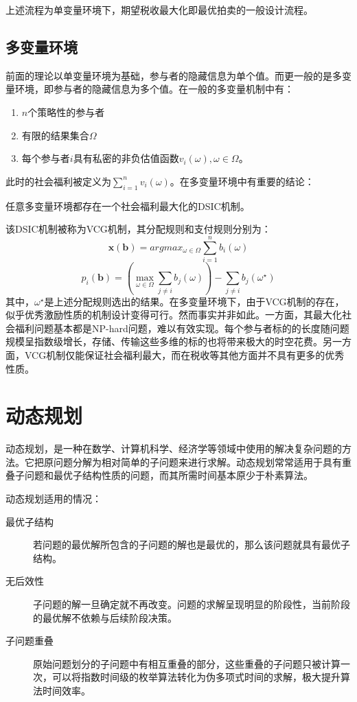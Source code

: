 \documentclass[promaster]{thesis-uestc}
\begin{document}
上述流程为单变量环境下，期望税收最大化即最优拍卖的一般设计流程。
\subsection{多变量环境}
前面的理论以单变量环境为基础，参与者的隐藏信息为单个值。而更一般的是多变量环境，即参与者的隐藏信息为多个值。在一般的多变量机制中有：

\begin{enumerate}
    \item $n$个策略性的参与者
    \item 有限的结果集合$\Omega$
    \item 每个参与者$i$具有私密的非负估值函数$v_i(\omega),\omega \in \Omega$。
\end{enumerate}

此时的社会福利被定义为$\sum_{i=1}^{n}{v_i(\omega)}$。在多变量环境中有重要的结论：
\begin{theorem}
    任意多变量环境都存在一个社会福利最大化的DSIC机制。
\end{theorem}
该DSIC机制被称为VCG机制，其分配规则和支付规则分别为：
\begin{equation}
 \mathbf{x}(\mathbf{b})=argmax_{\omega \in \Omega}\sum_{i=1}^{n}{b_i(\omega)}
\end{equation}
\begin{equation}
p_i(\mathbf{b})=\left(\max_{\omega\in\Omega}\sum_{j\neq i}{b_j(\omega)}\right)-\sum_{j\neq i}b_j(\omega^\star)    
\end{equation}
其中，$\omega^\star$是上述分配规则选出的结果。在多变量环境下，由于VCG机制的存在，似乎优秀激励性质的机制设计变得可行。然而事实并非如此。一方面，其最大化社会福利问题基本都是NP-hard问题，难以有效实现。每个参与者标的的长度随问题规模呈指数级增长，存储、传输这些多维的标的也将带来极大的时空花费。另一方面，VCG机制仅能保证社会福利最大，而在税收等其他方面并不具有更多的优秀性质。
\section{动态规划}
动态规划，是一种在数学、计算机科学、经济学等领域中使用的解决复杂问题的方法。它把原问题分解为相对简单的子问题来进行求解。动态规划常常适用于具有重叠子问题和最优子结构性质的问题，而其所需时间基本原少于朴素算法。

动态规划适用的情况：

\begin{description}
    \item[最优子结构]若问题的最优解所包含的子问题的解也是最优的，那么该问题就具有最优子结构。
    \item[无后效性]子问题的解一旦确定就不再改变。问题的求解呈现明显的阶段性，当前阶段的最优解不依赖与后续阶段决策。
    \item[子问题重叠]原始问题划分的子问题中有相互重叠的部分，这些重叠的子问题只被计算一次，可以将指数时间级的枚举算法转化为伪多项式时间的求解，极大提升算法时间效率。
\end{description}
\end{document}
